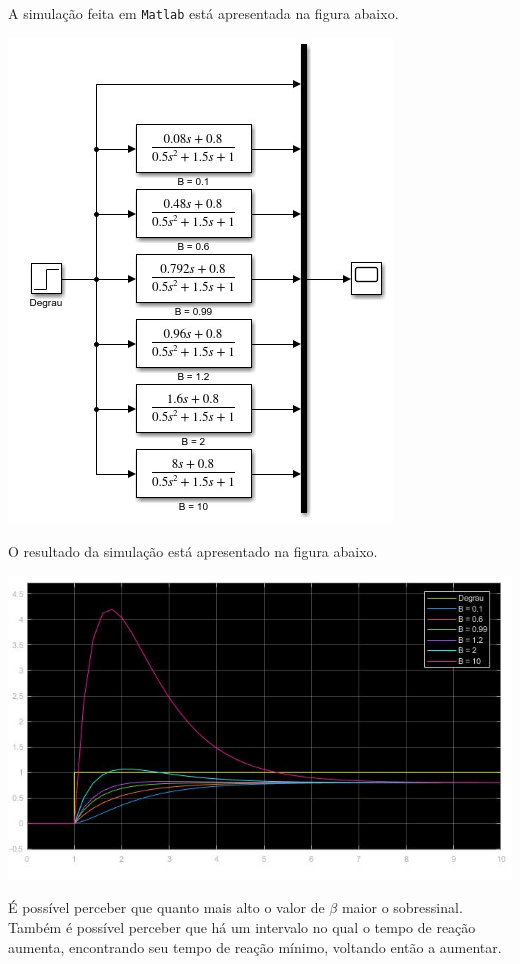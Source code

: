 \documentclass[
]{book}
\theoremstyle{definition}
\theoremstyle{definition}
\theoremstyle{definition}
\theoremstyle{remark}
\begin{document}
A simulação feita em \texttt{Matlab} está apresentada na figura abaixo.

\includegraphics{Imagens/Lab2/modelSim4.jpg}

O resultado da simulação está apresentado na figura abaixo.

\includegraphics{Imagens/Lab2/prob4SimResult.jpg}

É possível perceber que quanto mais alto o valor de \(\beta\) maior o sobressinal. Também é possível perceber que há um intervalo no qual o tempo de reação aumenta, encontrando seu tempo de reação mínimo, voltando então a aumentar.
\end{document}
